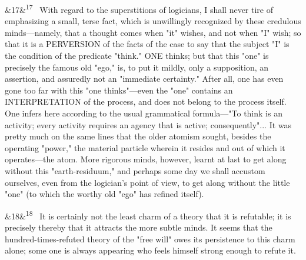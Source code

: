 \documentclass[12pt]{article}
\newcommand{\para}[1][]{\par\noindent\ifx&#1&\else\textsuperscript{\footnotesize #1}~\fi}
\begin{document}
\para[17] With regard to the superstitions of logicians, I shall never tire of emphasizing a small, terse fact, which is unwillingly recognized by these credulous minds---namely, that a thought comes when "it" wishes, and not when "I" wish; so that it is a PERVERSION of the facts of the case to say that the subject "I" is the condition of the predicate "think." ONE thinks; but that this "one" is precisely the famous old "ego," is, to put it mildly, only a supposition, an assertion, and assuredly not an "immediate certainty." After all, one has even gone too far with this "one thinks"---even the "one" contains an INTERPRETATION of the process, and does not belong to the process itself. One infers here according to the usual grammatical formula---"To think is an activity; every activity requires an agency that is active; consequently"... It was pretty much on the same lines that the older atomism sought, besides the operating "power," the material particle wherein it resides and out of which it operates---the atom. More rigorous minds, however, learnt at last to get along without this "earth-residuum," and perhaps some day we shall accustom ourselves, even from the logician's point of view, to get along without the little "one" (to which the worthy old "ego" has refined itself).

\para[18] It is certainly not the least charm of a theory that it is refutable; it is precisely thereby that it attracts the more subtle minds. It seems that the hundred-times-refuted theory of the "free will" owes its persistence to this charm alone; some one is always appearing who feels himself strong enough to refute it.
\end{document}
